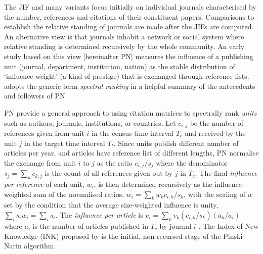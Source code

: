 \documentclass[10pt]{article}
\begin{document}
The JIF and many variants focus initially on individual journals characterised by the number, references and citations of their constituent papers. Comparisons to establish the relative standing of journals are made after the JIFs are computed. An alternative view is that journals inhabit a network or social system where relative standing is determined recursively by the whole community. An early study based on this view \citep{narinEVALUATIVEBIBLIOMETRICSUSE1976, pinski, narinStructureBiomedicalLiterature1976} [hereinafter PN] measures the influence of a publishing unit (journal, department, institution, nation) as the stable distribution of `influence weight' (a kind of prestige) that is exchanged through reference lists. \cite{vignaSpectralRanking2016} adopts the generic term \textit{spectral ranking} in a helpful summary of the antecedents and followers of PN.

PN provide a general approach to using citation matrices to spectrally rank \textit{units} such as authors, journals, institutions, or countries. Let $c_{i,j}$ be the number of references given from unit $i$ in the census time interval $T_c$ and received by the unit $j$ in the target time interval $T_t$. Since units publish different number of articles per year, and articles have reference list of different lengths, PN normalise the exchange from unit $i$ to $j$ as the ratio $c_{i,j}/s_j$ where the denominator $s_j = \sum_k c_{k,j}$ is the count of all references given out by $j$ in $T_c$. The final \textit{influence per reference} of each unit, $w_i$, is then determined recursively as the influence-weighted sum of the normalised ratios, $w_i = \sum_k w_k c_{i, k}/s_k$, with the scaling of $w$ set by the condition that the average size-weighted influence is unity, $\sum_i s_i w_i = \sum_i s_i$. The \textit{influence per article} is $v_i = \sum_kv_k (c_{i,k}/s_k) (a_k/a_i)$ where $a_i$ is the number of articles published in $T_c$ by journal $i$ \citep[see also][]{palacios-huertaMeasurementIntellectualInfluence2004}.  The Index of New Knowledge (INK) proposed by \cite{paulyReinterpretation145influenceWeight1462008} is the initial, non-recursed stage of the Pinski-Narin algorithm.
\end{document}

